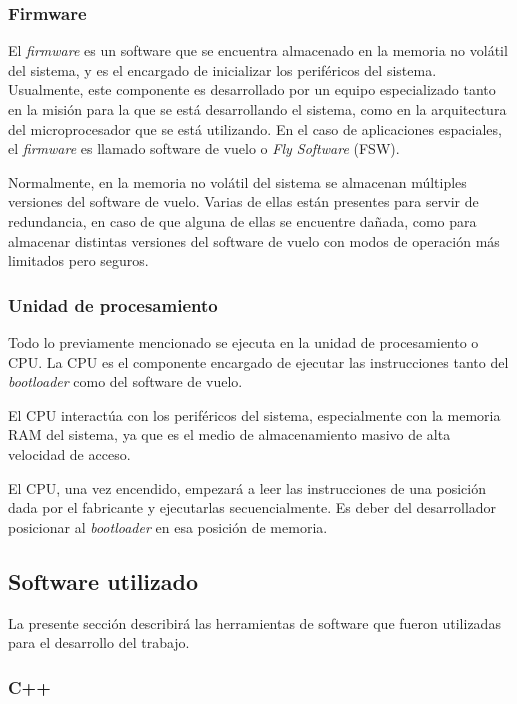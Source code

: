 \subsubsection{Firmware}
\label{subsec:firmware}

El \textit{firmware} es un software que se encuentra almacenado en la memoria no volátil del sistema, y es el encargado de inicializar los periféricos del sistema. Usualmente, este componente es desarrollado por un equipo especializado tanto en la misión para la que se está desarrollando el sistema, como en la arquitectura del microprocesador que se está utilizando. En el caso de aplicaciones espaciales, el \textit{firmware} es llamado software de vuelo o \textit{Fly Software} (FSW).

Normalmente, en la memoria no volátil del sistema se almacenan múltiples versiones del software de vuelo. Varias de ellas están presentes para servir de redundancia, en caso de que alguna de ellas se encuentre dañada, como para almacenar distintas versiones del software de vuelo con modos de operación más limitados pero seguros.

\subsubsection{Unidad de procesamiento}
\label{subsec:unidad_procesamiento}
Todo lo previamente mencionado se ejecuta en la unidad de procesamiento o CPU. La CPU es el componente encargado de ejecutar las instrucciones tanto del \textit{bootloader} como del software de vuelo.

El CPU interactúa con los periféricos del sistema, especialmente con la memoria RAM del sistema, ya que es el medio de almacenamiento masivo de alta velocidad de acceso.

El CPU, una vez encendido, empezará a leer las instrucciones de una posición dada por el fabricante y ejecutarlas secuencialmente. Es deber del desarrollador posicionar al \textit{bootloader} en esa posición de memoria.

\subsection{Software utilizado}
\label{subsec:software_utilizado}

La presente sección describirá las herramientas de software que fueron utilizadas para el desarrollo del trabajo.

\subsubsection{C++}
\label{subsec:cpp}

